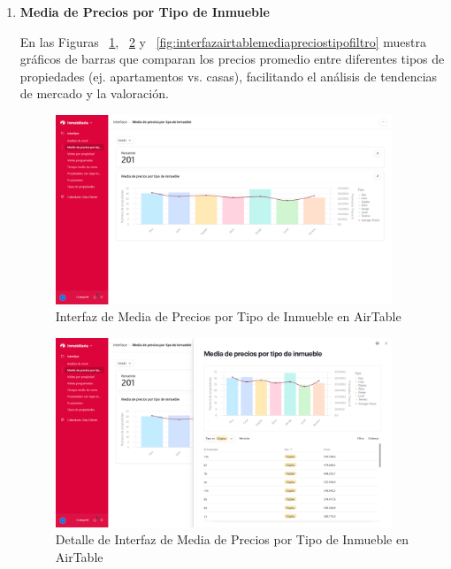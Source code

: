 \begin{enumerate}
    \item \textbf{Media de Precios por Tipo de Inmueble}

    En las Figuras ~\ref{fig:interfazairtablemediapreciostipo}, ~\ref{fig:interfazairtablemediapreciostipodetalle} y ~\ref{fig:interfazairtablemediapreciostipofiltro} muestra gráficos de barras que comparan los precios promedio entre diferentes tipos de propiedades (ej. apartamentos vs. casas), facilitando el análisis de tendencias de mercado y la valoración.

    \begin{figure}[H]
        \begin{center}
            \includegraphics[width = 0.95\textwidth]{Figuras/interfazairtablemediapreciostipo.png}
        \end{center}
        \caption{\label{fig:interfazairtablemediapreciostipo} Interfaz de Media de Precios por Tipo de Inmueble en AirTable}
    \end{figure}

    \begin{figure}[H]
        \begin{center}
            \includegraphics[width = 0.95\textwidth]{Figuras/interfazairtablemediapreciostipodetalle.png}
        \end{center}
        \caption{\label{fig:interfazairtablemediapreciostipodetalle} Detalle de Interfaz de Media de Precios por Tipo de Inmueble en AirTable}
    \end{figure}


\end{enumerate}
